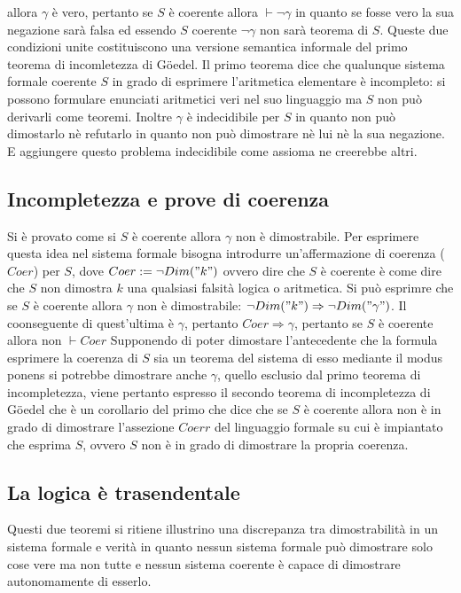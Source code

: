 allora $\gamma$ \`e vero, pertanto se $S$ \`e coerente allora $\vdash\neg\gamma$ in quanto se fosse vero la sua negazione sar\`a falsa ed essendo $S$ 
coerente $\neg\gamma$ non sar\`a teorema di $S$. Queste due condizioni unite costituiscono una versione semantica informale del primo teorema di 
incomletezza di G\"oedel. Il primo teorema dice che qualunque sistema formale coerente $S$ in grado di esprimere l'aritmetica elementare \`e incompleto:
si possono formulare enunciati aritmetici veri nel suo linguaggio ma $S$ non pu\`o derivarli come teoremi. Inoltre $\gamma$ \`e indecidibile per $S$ in 
quanto non pu\`o dimostarlo n\`e refutarlo in quanto non pu\`o dimostrare n\`e lui n\`e la sua negazione. E aggiungere questo problema indecidibile come
assioma ne creerebbe altri.
\subsection{Incompletezza e prove di coerenza}
Si \`e provato come si $S$ \`e coerente allora $\gamma$ non \`e dimostrabile. Per esprimere questa idea nel sistema formale bisogna introdurre 
un'affermazione di coerenza ($Coer$) per $S$, dove $Coer:=\neg Dim("k")$ ovvero dire che $S$ \`e coerente \`e come dire che $S$ non dimostra $k$ una 
qualsiasi falsit\`a logica o aritmetica. Si pu\`o esprimre che se $S$ \`e coerente allora $\gamma$ non \`e dimostrabile: $\neg Dim("k")\Rightarrow\neg 
Dim("\gamma")$. Il coonseguente di quest'ultima \`e $\gamma$, pertanto $Coer\Rightarrow\gamma$, pertanto se $S$ \`e coerente allora non $\vdash Coer$
Supponendo di poter dimostare l'antecedente che la formula esprimere la coerenza di $S$ sia un teorema del sistema di esso mediante il modus ponens si 
potrebbe dimostrare anche $\gamma$, quello esclusio dal primo teorema di incompletezza, viene pertanto espresso il secondo teorema di incompletezza di 
G\"oedel che \`e un corollario del primo che dice che se $S$ \`e coerente allora non \`e in grado di dimostrare l'assezione $Coerr$ del linguaggio formale
su cui \`e impiantato che esprima $S$, ovvero $S$ non \`e in grado di dimostrare la propria coerenza. 
\subsection{La logica \`e trasendentale}
Questi due teoremi si ritiene illustrino una discrepanza tra dimostrabilit\`a in un sistema formale e verit\`a in quanto nessun sistema formale pu\`o 
dimostrare solo cose vere ma non tutte e nessun sistema coerente \`e capace di dimostrare autonomamente di esserlo. 